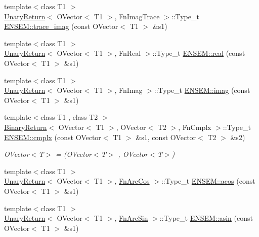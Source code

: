 \begin{DoxyCompactItemize}
\item 
{\footnotesize template$<$class T1 $>$ }\\\mbox{\hyperlink{structUnaryReturn}{Unary\+Return}}$<$ O\+Vector$<$ T1 $>$, Fn\+Imag\+Trace $>$\+::Type\+\_\+t \mbox{\hyperlink{group__obsvector_ga42b95d27dd97c7484c4ddcc401aa305f}{E\+N\+S\+E\+M\+::trace\+\_\+imag}} (const O\+Vector$<$ T1 $>$ \&s1)
\item 
{\footnotesize template$<$class T1 $>$ }\\\mbox{\hyperlink{structUnaryReturn}{Unary\+Return}}$<$ O\+Vector$<$ T1 $>$, Fn\+Real $>$\+::Type\+\_\+t \mbox{\hyperlink{group__obsvector_ga655235d17cdd06edc03c39a79f110d59}{E\+N\+S\+E\+M\+::real}} (const O\+Vector$<$ T1 $>$ \&s1)
\item 
{\footnotesize template$<$class T1 $>$ }\\\mbox{\hyperlink{structUnaryReturn}{Unary\+Return}}$<$ O\+Vector$<$ T1 $>$, Fn\+Imag $>$\+::Type\+\_\+t \mbox{\hyperlink{group__obsvector_gaf1cbe27c6155721a04405dcecb528d53}{E\+N\+S\+E\+M\+::imag}} (const O\+Vector$<$ T1 $>$ \&s1)
\item 
{\footnotesize template$<$class T1 , class T2 $>$ }\\\mbox{\hyperlink{structBinaryReturn}{Binary\+Return}}$<$ O\+Vector$<$ T1 $>$, O\+Vector$<$ T2 $>$, Fn\+Cmplx $>$\+::Type\+\_\+t \mbox{\hyperlink{group__obsvector_ga363734253f08749647255a90c647284c}{E\+N\+S\+E\+M\+::cmplx}} (const O\+Vector$<$ T1 $>$ \&s1, const O\+Vector$<$ T2 $>$ \&s2)
\begin{DoxyCompactList}\small\item\em O\+Vector$<$\+T$>$ = (O\+Vector$<$\+T$>$ , O\+Vector$<$\+T$>$) \end{DoxyCompactList}\item 
{\footnotesize template$<$class T1 $>$ }\\\mbox{\hyperlink{structUnaryReturn}{Unary\+Return}}$<$ O\+Vector$<$ T1 $>$, \mbox{\hyperlink{structFnArcCos}{Fn\+Arc\+Cos}} $>$\+::Type\+\_\+t \mbox{\hyperlink{group__obsvector_ga3b0e5ce4d5c52455bce825cd795a0363}{E\+N\+S\+E\+M\+::acos}} (const O\+Vector$<$ T1 $>$ \&s1)
\item 
{\footnotesize template$<$class T1 $>$ }\\\mbox{\hyperlink{structUnaryReturn}{Unary\+Return}}$<$ O\+Vector$<$ T1 $>$, \mbox{\hyperlink{structFnArcSin}{Fn\+Arc\+Sin}} $>$\+::Type\+\_\+t \mbox{\hyperlink{group__obsvector_ga90cc9607dddfb6dc09c58de601982b10}{E\+N\+S\+E\+M\+::asin}} (const O\+Vector$<$ T1 $>$ \&s1)
\item 

\end{DoxyCompactItemize}
